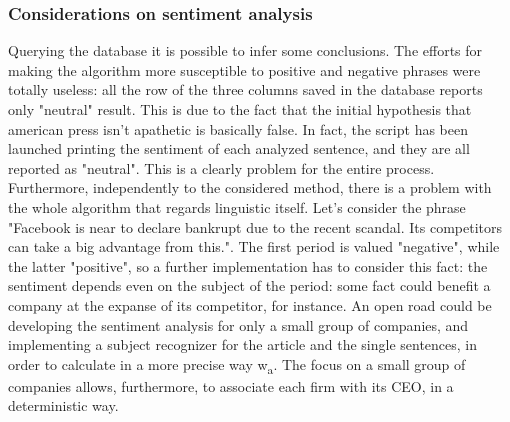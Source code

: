 \subsubsection{Considerations on sentiment analysis}
Querying the database it is possible to infer some conclusions. The efforts for making the algorithm more susceptible to positive and negative phrases were totally useless: all the row of the three columns saved in the database reports only "neutral" result. This is due to the fact that the initial hypothesis that american press isn't apathetic is basically false. In fact, the script has been launched printing the sentiment of each analyzed sentence, and they are all reported as "neutral". This is a clearly problem for the entire process. \\
Furthermore, independently to the considered method, there is a problem with the whole algorithm that regards linguistic itself. Let's consider the phrase "Facebook is near to declare bankrupt due to the recent scandal. Its competitors can take a big advantage from this.". The first period is valued "negative", while the latter "positive", so a further implementation has to consider this fact: the sentiment depends even on the subject of the period: some fact could benefit a company at the expanse of its competitor, for instance. An open road could be developing the sentiment analysis for only a small group of companies, and implementing a subject recognizer for the article and the single sentences, in order to calculate in a more precise way w\textsubscript{a}. The focus on a small group of companies allows, furthermore, to associate each firm with its CEO, in a deterministic way.  